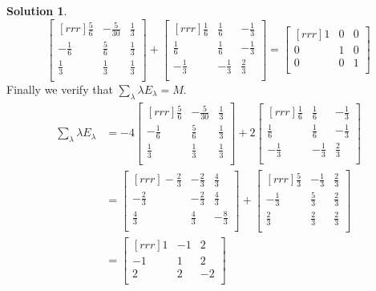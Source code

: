 \documentclass[12pt]{article}
\theoremstyle{definition}
\newtheorem*{solution}{Solution} %
\theoremstyle{plain}
\begin{document}
\begin{solution}
\[ \begin{bmatrix}[rrr]\frac{5}{6}&-\frac{5}{30}&\frac{1}{3}\\-\frac{1}{6}&\frac{5}{6}&\frac{1}{3}\\\frac{1}{3}&\frac{1}{3}&\frac{1}{3}\\\end{bmatrix} + \begin{bmatrix}[rrr]\frac{1}{6}&\frac{1}{6}&-\frac{1}{3}\\\frac{1}{6}&\frac{1}{6}&-\frac{1}{3}\\-\frac{1}{3}&-\frac{1}{3}&\frac{2}{3}\\\end{bmatrix} = \begin{bmatrix}[rrr]1&0&0\\0&1&0\\0&0&1\\\end{bmatrix} \]
Finally we verify that $\sum_\lambda \lambda E_\lambda = M$.
\begin{align*}
\sum_\lambda \lambda E_\lambda &= -4\begin{bmatrix}[rrr]\frac{5}{6}&-\frac{5}{30}&\frac{1}{3}\\-\frac{1}{6}&\frac{5}{6}&\frac{1}{3}\\\frac{1}{3}&\frac{1}{3}&\frac{1}{3}\\\end{bmatrix} + 2\begin{bmatrix}[rrr]\frac{1}{6}&\frac{1}{6}&-\frac{1}{3}\\\frac{1}{6}&\frac{1}{6}&-\frac{1}{3}\\-\frac{1}{3}&-\frac{1}{3}&\frac{2}{3}\\\end{bmatrix}\\
&= \begin{bmatrix}[rrr]-\frac{2}{3}&-\frac{2}{3}&\frac{4}{3}\\-\frac{2}{3}&-\frac{2}{3}&\frac{4}{3}\\\frac{4}{3}&\frac{4}{3}&-\frac{8}{3}\\\end{bmatrix} + \begin{bmatrix}[rrr]\frac{5}{3}&-\frac{1}{3}&\frac{2}{3}\\-\frac{1}{3}&\frac{5}{3}&\frac{2}{3}\\\frac{2}{3}&\frac{2}{3}&\frac{2}{3}\\\end{bmatrix}\\
&= \begin{bmatrix}[rrr]1&-1&2\\-1&1&2\\2&2&-2\\\end{bmatrix}
\end{align*}
\end{solution}
\end{document}
